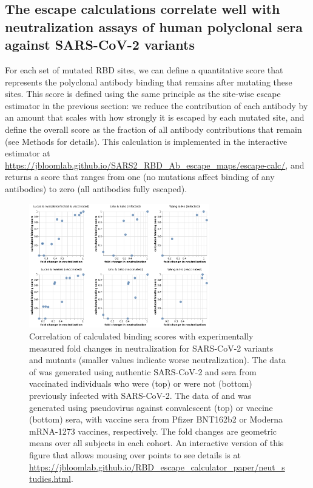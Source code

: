 \documentclass[9pt,twocolumn,twoside]{gsajnl_modified}
\begin{document}
\subsection{The escape calculations correlate well with neutralization assays of human polyclonal sera against SARS-CoV-2 variants}
For each set of mutated RBD sites, we can define a quantitative score that represents the polyclonal antibody binding that remains after mutating these sites.
This score is defined using the same principle as the site-wise escape estimator in the previous section: we reduce the contribution of each antibody by an amount that scales with how strongly it is escaped by each mutated site, and define the overall score as the fraction of all antibody contributions that remain (see Methods for details).
This calculation is implemented in the interactive estimator at \url{https://jbloomlab.github.io/SARS2_RBD_Ab_escape_maps/escape-calc/}, and returns a score that ranges from one (no mutations affect binding of any antibodies) to zero (all antibodies fully escaped).

\begin{figure}
\includegraphics[width=0.7\textwidth]{../results/neut_studies/neut_studies.png}
\caption{Correlation of calculated binding scores with experimentally measured fold changes in neutralization for SARS-CoV-2 variants and mutants (smaller values indicate worse neutralization).
The data of \citet{lucas2021impact} was generated using authentic SARS-CoV-2 and sera from vaccinated individuals who were (top) or were not (bottom) previously infected with SARS-CoV-2.
The data of \citet{uriu2021neutralization} and \citet{wang2021antibody} was generated using pseudovirus against convalescent (top) or vaccine (bottom) sera, with vaccine sera from Pfizer BNT162b2 or Moderna mRNA-1273 vaccines, respectively. 
The fold changes are geometric means over all subjects in each cohort.
An interactive version of this figure that allows mousing over points to see details is at \url{https://jbloomlab.github.io/RBD_escape_calculator_paper/neut_studies.html}.
}
\label{fig:neut_studies}
\end{figure}
\end{document}
